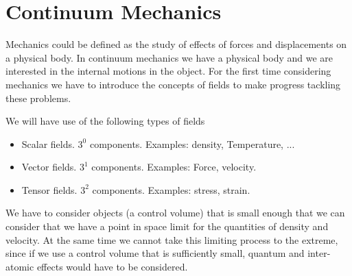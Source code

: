 % 
% 
% 
% 
% 
% 
% 
% 
% 
% 
% 
% 
\section{Continuum Mechanics}


Mechanics could be defined as the study of effects of forces and displacements on a physical body.  In continuum mechanics we have a physical body and we are interested in the internal motions in the object.  For the first time considering mechanics we have to introduce the concepts of fields to make progress tackling these problems.

We will have use of the following types of fields

\begin{itemize}
\item Scalar fields.  $3^0$ components.  Examples: density, Temperature, ...
\item Vector fields.  $3^1$ components.  Examples: Force, velocity.
\item Tensor fields.  $3^2$ components.  Examples: stress, strain.
\end{itemize}

We have to consider objects (a control volume) that is small enough that we can consider that we have a point in space limit for the quantities of density and velocity.  At the same time we cannot take this limiting process to the extreme, since if we use a control volume that is sufficiently small, quantum and inter-atomic effects would have to be considered.


